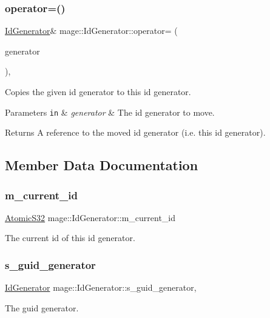 \subsubsection{\texorpdfstring{operator=()}{operator=()}\hspace{0.1cm}{\footnotesize\ttfamily [2/2]}}
{\footnotesize\ttfamily \hyperlink{classmage_1_1_id_generator}{Id\+Generator}\& mage\+::\+Id\+Generator\+::operator= (\begin{DoxyParamCaption}\item[{\hyperlink{classmage_1_1_id_generator}{Id\+Generator} \&\&}]{generator }\end{DoxyParamCaption})\hspace{0.3cm}{\ttfamily [default]}, {\ttfamily [noexcept]}}

Copies the given id generator to this id generator.


\begin{DoxyParams}[1]{Parameters}
\mbox{\tt in}  & {\em generator} & The id generator to move. \\
\hline
\end{DoxyParams}
\begin{DoxyReturn}{Returns}
A reference to the moved id generator (i.\+e. this id generator). 
\end{DoxyReturn}


\subsection{Member Data Documentation}
\hypertarget{classmage_1_1_id_generator_af834ccd6b694775f434949a1c1382965}{}\label{classmage_1_1_id_generator_af834ccd6b694775f434949a1c1382965} 
\subsubsection{\texorpdfstring{m\+\_\+current\+\_\+id}{m\_current\_id}}
{\footnotesize\ttfamily \hyperlink{namespacemage_a34972c09c02b691cd7cc5ea34db1e778}{Atomic\+S32} mage\+::\+Id\+Generator\+::m\+\_\+current\+\_\+id\hspace{0.3cm}{\ttfamily [private]}}

The current id of this id generator. \hypertarget{classmage_1_1_id_generator_aae064239698f2a64515bc0e91ff9a303}{}\label{classmage_1_1_id_generator_aae064239698f2a64515bc0e91ff9a303} 
\subsubsection{\texorpdfstring{s\+\_\+guid\+\_\+generator}{s\_guid\_generator}}
{\footnotesize\ttfamily \hyperlink{classmage_1_1_id_generator}{Id\+Generator} mage\+::\+Id\+Generator\+::s\+\_\+guid\+\_\+generator\hspace{0.3cm}{\ttfamily [static]}, {\ttfamily [private]}}

The guid generator. 